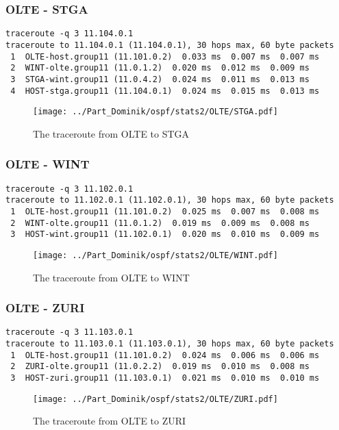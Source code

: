 \subsubsection{OLTE - STGA}
\begin{lstlisting}
traceroute -q 3 11.104.0.1
traceroute to 11.104.0.1 (11.104.0.1), 30 hops max, 60 byte packets
 1  OLTE-host.group11 (11.101.0.2)  0.033 ms  0.007 ms  0.007 ms
 2  WINT-olte.group11 (11.0.1.2)  0.020 ms  0.012 ms  0.009 ms
 3  STGA-wint.group11 (11.0.4.2)  0.024 ms  0.011 ms  0.013 ms
 4  HOST-stga.group11 (11.104.0.1)  0.024 ms  0.015 ms  0.013 ms
\end{lstlisting}
\begin{figure}[H]
\centering
\texttt{[image: ../Part\_Dominik/ospf/stats2/OLTE/STGA.pdf]}
\caption{The traceroute from OLTE to STGA}
\end{figure}
\clearpage
\subsubsection{OLTE - WINT}
\begin{lstlisting}
traceroute -q 3 11.102.0.1
traceroute to 11.102.0.1 (11.102.0.1), 30 hops max, 60 byte packets
 1  OLTE-host.group11 (11.101.0.2)  0.025 ms  0.007 ms  0.008 ms
 2  WINT-olte.group11 (11.0.1.2)  0.019 ms  0.009 ms  0.008 ms
 3  HOST-wint.group11 (11.102.0.1)  0.020 ms  0.010 ms  0.009 ms
\end{lstlisting}
\begin{figure}[H]
\centering
\texttt{[image: ../Part\_Dominik/ospf/stats2/OLTE/WINT.pdf]}
\caption{The traceroute from OLTE to WINT}
\end{figure}
\clearpage
\subsubsection{OLTE - ZURI}
\begin{lstlisting}
traceroute -q 3 11.103.0.1
traceroute to 11.103.0.1 (11.103.0.1), 30 hops max, 60 byte packets
 1  OLTE-host.group11 (11.101.0.2)  0.024 ms  0.006 ms  0.006 ms
 2  ZURI-olte.group11 (11.0.2.2)  0.019 ms  0.010 ms  0.008 ms
 3  HOST-zuri.group11 (11.103.0.1)  0.021 ms  0.010 ms  0.010 ms
\end{lstlisting}
\begin{figure}[H]
\centering
\texttt{[image: ../Part\_Dominik/ospf/stats2/OLTE/ZURI.pdf]}
\caption{The traceroute from OLTE to ZURI}
\end{figure}
\clearpage
